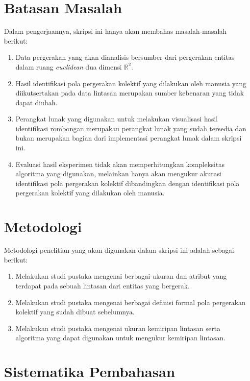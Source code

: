 \section{Batasan Masalah}
\label{sec:batasan}

Dalam pengerjaannya, skripsi ini hanya akan membahas masalah-masalah berikut:

\begin{enumerate}
    \item Data pergerakan yang akan dianalisis bersumber dari pergerakan entitas dalam ruang \textit{euclidean} dua dimensi $\mathbb{R}^2$.
    \item Hasil identifikasi pola pergerakan kolektif yang dilakukan oleh manusia yang diikutsertakan pada data lintasan merupakan sumber kebenaran yang tidak dapat diubah.
    \item Perangkat lunak yang digunakan untuk melakukan visualisasi hasil identifikasi rombongan merupakan perangkat lunak yang sudah tersedia dan bukan merupakan bagian dari implementasi perangkat lunak dalam skripsi ini.
    \item Evaluasi hasil eksperimen tidak akan memperhitungkan kompleksitas algoritma yang digunakan, melainkan hanya akan mengukur akurasi identifikasi pola pergerakan kolektif dibandingkan dengan identifikasi pola pergerakan kolektif yang dilakukan oleh manusia.
\end{enumerate}

\section{Metodologi}
\label{sec:metlit}

Metodologi penelitian yang akan digunakan dalam skripsi ini adalah sebagai berikut:

\begin{enumerate}
    \item Melakukan studi pustaka mengenai berbagai ukuran dan atribut yang terdapat pada sebuah lintasan dari entitas yang bergerak.
    \item Melakukan studi pustaka mengenai berbagai definisi formal pola pergerakan kolektif yang sudah dibuat sebelumnya.
    \item Melakukan studi pustaka mengenai ukuran kemiripan lintasan serta algoritma yang dapat digunakan untuk mengukur kemiripan lintasan.
\end{enumerate}

\section{Sistematika Pembahasan}
\label{sec:sispem}

